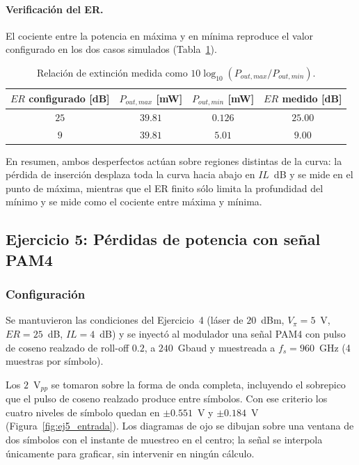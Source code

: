 \paragraph{Verificación del ER.}
El cociente entre la potencia en máxima y en mínima reproduce el valor
configurado en los dos casos simulados (Tabla~\ref{tab:ej4_er}).

\begin{table}[H]
\centering
\small
\begin{tabular}{cccc}
\toprule
$ER$ configurado [dB] & $P_{out,max}$ [mW] & $P_{out,min}$ [mW] & $ER$ medido [dB] \\
\midrule
$25$ & $39.81$ & $0.126$ & $25.00$ \\
$9$  & $39.81$ & $5.01$  & $9.00$ \\
\bottomrule
\end{tabular}
\caption{Relación de extinción medida como
$10\log_{10}(P_{out,max}/P_{out,min})$.}
\label{tab:ej4_er}
\end{table}

En resumen, ambos desperfectos actúan sobre regiones distintas de la
curva: la pérdida de inserción desplaza toda la curva hacia abajo en
$IL$~dB y se mide en el punto de máxima, mientras que el ER finito sólo
limita la profundidad del mínimo y se mide como el cociente entre máxima y
mínima.

\subsection*{Ejercicio 5: Pérdidas de potencia con señal PAM4}

\subsubsection*{Configuración}

Se mantuvieron las condiciones del Ejercicio~4 (láser de $20$~dBm,
$V_\pi = 5$~V, $ER = 25$~dB, $IL = 4$~dB) y se inyectó al modulador una
señal PAM4 con pulso de coseno realzado de roll-off $0.2$, a $240$~Gbaud y
muestreada a $f_s = 960$~GHz (4 muestras por símbolo).

Los $2$~V$_{pp}$ se tomaron sobre la forma de onda completa, incluyendo el
sobrepico que el pulso de coseno realzado produce entre símbolos. Con ese
criterio los cuatro niveles de símbolo quedan en $\pm0.551$~V y
$\pm0.184$~V (Figura~\ref{fig:ej5_entrada}). Los diagramas de ojo se
dibujan sobre una ventana de dos símbolos con el instante de muestreo en el
centro; la señal se interpola únicamente para graficar, sin intervenir en
ningún cálculo.

